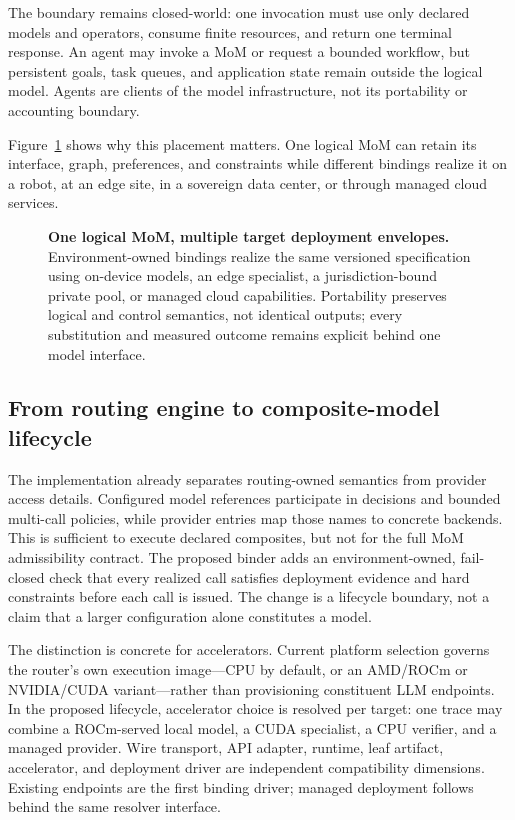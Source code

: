 The boundary remains closed-world: one invocation must use only declared models
and operators, consume finite resources, and return one terminal response.
An agent may invoke a MoM or request a bounded workflow, but persistent goals,
task queues, and application state remain outside the logical model. Agents are
clients of the model infrastructure, not its portability or accounting
boundary.

Figure~\ref{fig:deployment-envelopes} shows why this placement matters. One
logical MoM can retain its interface, graph, preferences, and constraints while
different bindings realize it on a robot, at an edge site, in a sovereign data
center, or through managed cloud services.

\begin{figure}[htbp]
  \centering
  \resizebox{\linewidth}{!}{}
  \caption{\textbf{One logical MoM, multiple target deployment envelopes.}
  Environment-owned bindings realize the same versioned specification using
  on-device models, an edge specialist, a jurisdiction-bound private pool, or
  managed cloud capabilities. Portability preserves logical and control
  semantics, not identical outputs; every substitution and measured outcome
  remains explicit behind one model interface.}
  \label{fig:deployment-envelopes}
\end{figure}

\FloatBarrier
\subsection{From routing engine to composite-model lifecycle}

The implementation already separates routing-owned semantics from provider
access details. Configured model references participate in decisions and
bounded multi-call policies, while provider entries map those names to concrete
backends. This is sufficient to execute declared composites, but not for
the full MoM admissibility contract. The proposed binder adds an
environment-owned, fail-closed check that every realized call satisfies
deployment evidence and hard constraints before each call is issued. The
change is a lifecycle boundary, not a claim that a larger
configuration alone constitutes a model.

The distinction is concrete for accelerators. Current platform selection
governs the router's own execution image---CPU by default, or an AMD/ROCm or
NVIDIA/CUDA variant---rather than provisioning constituent LLM endpoints. In
the proposed lifecycle, accelerator choice is resolved per target: one trace
may combine a ROCm-served local model, a CUDA specialist, a CPU verifier, and a
managed provider. Wire transport, API adapter, runtime, leaf artifact,
accelerator, and deployment driver are independent compatibility dimensions.
Existing endpoints are the first binding driver; managed deployment follows
behind the same resolver interface.

